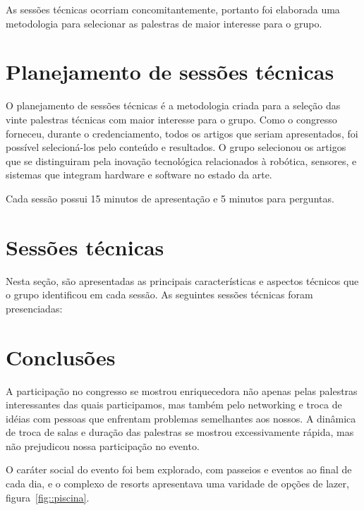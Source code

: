 \documentclass[12pt,a4paper]{article}
\begin{document}
As sessões técnicas ocorriam concomitantemente, portanto foi elaborada uma
metodologia para selecionar as palestras de maior interesse para o grupo. 

\section{Planejamento de sessões técnicas}
O planejamento de sessões técnicas é a metodologia criada para a seleção das
vinte palestras técnicas com maior interesse para o grupo. Como o congresso
forneceu, durante o credenciamento, todos os artigos que seriam apresentados,
foi possível selecioná-los pelo conteúdo e resultados. O grupo selecionou os
artigos que se distinguiram pela inovação tecnológica relacionados à robótica,
sensores, e sistemas que integram hardware e software no estado da arte.

Cada sessão possui 15 minutos de apresentação e 5 minutos para perguntas.

\section{Sessões técnicas}
Nesta seção, são apresentadas as principais características e aspectos técnicos
que o grupo identificou em cada sessão. As seguintes sessões técnicas foram
presenciadas:



\section{Conclusões}
A participação no congresso se mostrou enriquecedora não apenas pelas palestras
interessantes das quais participamos, mas também pelo networking e troca de
idéias com pessoas que enfrentam problemas semelhantes aos nossos. A dinâmica de
troca de salas e duração das palestras se mostrou excessivamente rápida, mas não
prejudicou nossa participação no evento.

O caráter social do evento foi bem explorado, com passeios e eventos ao final de
cada dia, e o complexo de resorts apresentava uma varidade de opções de lazer,
figura~\ref{fig::piscina}.
\end{document}
